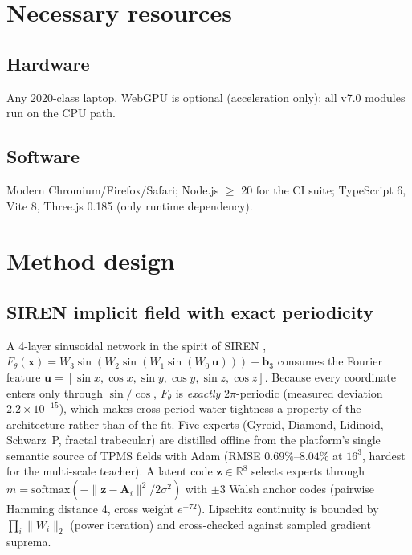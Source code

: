 \documentclass[5p,times,authoryear]{elsarticle}
\begin{document}
\section{Necessary resources}
\subsection{Hardware}
Any 2020-class laptop. WebGPU is optional (acceleration only); all v7.0 modules run on the CPU path.

\subsection{Software}
Modern Chromium/Firefox/Safari; Node.js $\ge$ 20 for the CI suite; TypeScript 6, Vite 8,
Three.js 0.185 (only runtime dependency).

\section{Method design}
\subsection{SIREN implicit field with exact periodicity}
A 4-layer sinusoidal network in the spirit of SIREN \cite{sitzmann2020siren},
$F_\theta(\mathbf{x})=W_3\sin(W_2\sin(W_1\sin(W_0\,\mathbf{u})))
+\mathbf{b}_3$ consumes the Fourier feature $\mathbf{u}=[\sin x,\cos x,\sin y,\cos y,\sin z,\cos z]$.
Because every coordinate enters only through $\sin/\cos$, $F_\theta$ is \emph{exactly} $2\pi$-periodic
(measured deviation $2.2\times10^{-15}$), which makes cross-period water-tightness a property of the
architecture rather than of the fit. Five experts (Gyroid, Diamond, Lidinoid, Schwarz~P, fractal
trabecular) are distilled offline from the platform's single semantic source of TPMS fields with
Adam (RMSE $0.69\%$--$8.04\%$ at $16^3$, hardest for the multi-scale teacher). A latent code
$\mathbf{z}\in\mathbb{R}^8$ selects experts through
$m=\mathrm{softmax}(-\|\mathbf{z}-\mathbf{A}_i\|^2/2\sigma^2)$ with $\pm3$ Walsh anchor codes
(pairwise Hamming distance 4, cross weight $e^{-72}$). Lipschitz continuity is bounded by
$\prod_i\|W_i\|_2$ (power iteration) and cross-checked against sampled gradient suprema.
\end{document}
